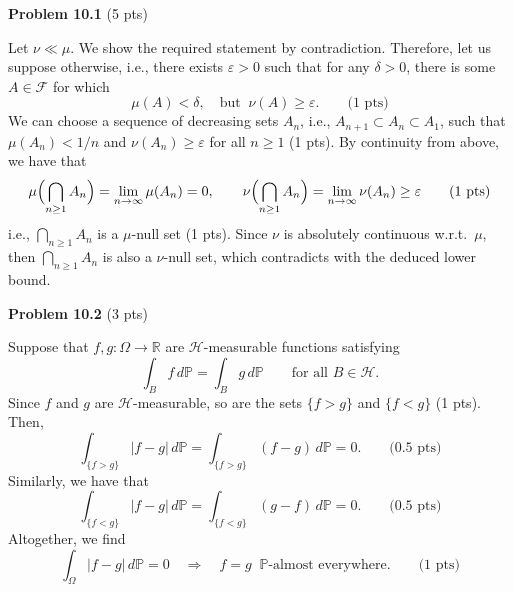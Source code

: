 \textbf{Problem 10.1} (5 pts)

Let $\nu\ll \mu$. We show the required statement by contradiction. Therefore, let us suppose otherwise, i.e., there exists $\varepsilon>0$ such that for any $\delta>0$, there is some $A\in\mathcal{F}$ for which
\[
	\mu(A)<\delta,\quad\text{but}\;\;\nu(A)\ge \varepsilon.\qquad\text{(1 pts)}
\]
We can choose a sequence of decreasing sets $A_n$, i.e., $A_{n+1}\subset A_n\subset A_1$, such that $\mu(A_n)<1/n$ and $\nu(A_n)\ge \varepsilon$ for all $n\ge 1$ (1 pts). By continuity from above, we have that
\[
	\mu\Bigl(\bigcap_{n\ge 1} A_n\Bigr) = \lim_{n\to\infty} \mu(A_n) = 0,\qquad \nu\Bigl(\bigcap_{n\ge 1} A_n\Bigr) = \lim_{n\to\infty} \nu(A_n) \ge \varepsilon\qquad \text{(1 pts)}
\]
i.e., $\bigcap_{n\ge 1} A_n$ is a $\mu$-null set (1 pts). Since $\nu$ is absolutely continuous w.r.t.\ $\mu$, then $\bigcap_{n\ge 1} A_n$ is also a $\nu$-null set, which contradicts with the deduced lower bound. 

\bigskip
\textbf{Problem 10.2} (3 pts)

Suppose that $f,g:\Omega\to\mathbb{R}$ are $\mathcal{H}$-measurable functions satisfying
\[
	\int_B f\,d\mathbb{P} = \int_B g\,d\mathbb{P} \qquad\text{for all $B\in\mathcal{H}$}.
\]
Since $f$ and $g$ are $\mathcal{H}$-measurable, so are the sets $\{f>g\}$ and $\{f<g\}$ (1 pts). Then,
\[
	\int_{\{f>g\}} |f-g| \,d\mathbb{P} = \int_{\{f>g\}} (f-g) \,d\mathbb{P} = 0.\qquad \text{(0.5 pts)}
\]
Similarly, we have that
\[
	\int_{\{f<g\}} |f-g| \,d\mathbb{P} = \int_{\{f<g\}} (g-f) \,d\mathbb{P} = 0.\qquad \text{(0.5 pts)}
\]
Altogether, we find
\[
	\int_\Omega |f-g| \,d\mathbb{P} = 0\quad\Longrightarrow\quad f=g\;\;\text{$\mathbb{P}$-almost everywhere.}\qquad \text{(1 pts)}
\]






